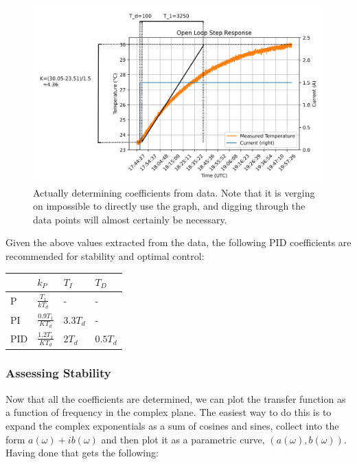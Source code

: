 \documentclass[11pt, letterpaper]{article}
\begin{document}
\begin{figure}[H]
    \centering
    \includegraphics[width=18cm]{realOpenLoopStep.png}
    \caption{ Actually determining coefficients from data. Note that it is verging on impossible to directly use the graph, and digging through the data points will almost certainly be necessary. }
    \label{fig:realOpenLoopStep}
\end{figure}

Given the above values extracted from the data, the following PID coefficients are recommended for stability and optimal control:

\begin{table}[H]
\centering
\begin{tabular}{llll}
     & $k_P$ & $T_I$ & $T_D$  \\[0.3cm] \hline
 P   & $\frac{T_1}{kT_d}$  & -  & - \\[0.3cm]
 PI  & $\frac{0.9 T_1}{KT_d}$  & $3.3T_d$ &  -\\[0.3cm]
 PID & $\frac{1.2 T_1}{KT_d}$  & $2T_d$  & $0.5T_d$
\end{tabular}
\end{table}

\subsubsection{Assessing Stability}
Now that all the coefficients are determined, we can plot the transfer function as a function of frequency in the complex plane. The easiest way to do this is to expand the complex exponentials as a sum of cosines and sines, collect into the form $a(\omega)+ib(\omega)$ and then plot it as a parametric curve, $(a(\omega),b(\omega))$. Having done that gets the following:
\end{document}

